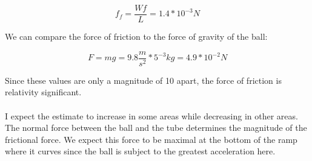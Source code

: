 \documentclass{article}
\begin{document}
\begin{equation}
    f_{f} = \frac{Wf}{L} = 1.4 * 10^{-3} \si{N}
\end{equation}

We can compare the force of friction to the force of gravity of the ball:

\begin{equation}
F = mg = 9.8\frac{\si{m}}{\si{s}^{2}} * 5^{-3} \si{kg} = 4.9 * 10^{-2} \si{N}
\end{equation}

Since these values are only a magnitude of 10 apart, the force of friction is relativity significant.
\\\\
I expect the estimate to increase in some areas while decreasing in other areas. The normal force between the ball and the tube determines the magnitude of the frictional force. We expect this force to be maximal at the bottom of the ramp where it curves since the ball is subject to the greatest acceleration here.


 

 

 
\end{document}
